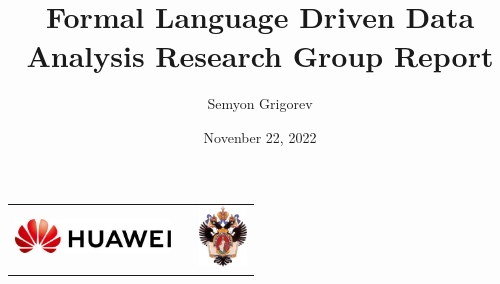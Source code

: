 \documentclass[xcolor=table,aspectratio=169]{beamer}
\title[FLDDA Research Group Report]{Formal Language Driven Data Analysis Research Group Report}
\institute[SPbSU]{
Saint Petersburg State University
}
\author[Semyon Grigorev]{Semyon Grigorev}
\date{Novenber 22, 2022}
\begin{document}
{
\begin{frame}[fragile]
  \begin{table}
  \centering
  \begin{tabularx}{\linewidth}{XcX}
    \includegraphics[height=0.9cm]{pictures/hu_logo.jpeg} \hfill
    & 
    & \hfill \includegraphics[height=1.6cm]{pictures/SPbGU_Logo.png}
  \end{tabularx}
  \end{table}
  \titlepage
\end{frame}
}
\end{document}
